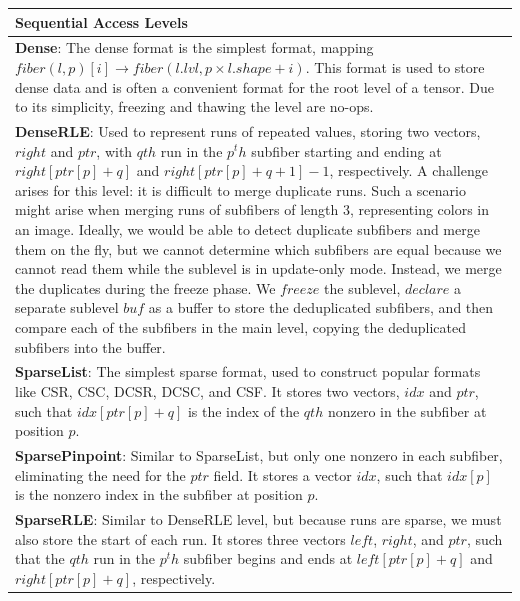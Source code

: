 \begin{table}[ht]
    \centering
    \scriptsize
    \renewcommand{\arraystretch}{1.3}
    \begin{tabular}{p{14cm}}

    \hline
    \textbf{Sequential Access Levels} \\
    \hline
    \textbf{Dense}:
    The dense format is the simplest format, mapping $fiber(l, p)[i] \rightarrow fiber(l.lvl, p \times l.shape + i)$.
    This format is used to store dense data and is often a convenient format for the root level of a tensor.
    Due to its simplicity, freezing and thawing the level are no-ops. \\
    \textbf{DenseRLE}:
    Used to represent runs of repeated values, storing two vectors, $right$ and $ptr$, with $qth$ run in the $p^th$ subfiber starting and ending at $right[ptr[p] + q]$ and $right[ptr[p] + q + 1] - 1$, respectively.
    A challenge arises for this level: it is difficult to merge duplicate runs.
    Such a scenario might arise when merging runs of subfibers of length 3, representing colors in an image.
    Ideally, we would be able to detect duplicate subfibers and merge them on the fly, but we cannot determine which subfibers are equal because we cannot read them while the sublevel is in update-only mode.
    Instead, we merge the duplicates during the freeze phase.
    We $freeze$ the sublevel, $declare$ a separate sublevel $buf$ as a buffer to store the deduplicated subfibers, and then compare each of the subfibers in the main level, copying the deduplicated subfibers into the buffer. \\
    \textbf{SparseList}:
    The simplest sparse format, used to construct popular formats like CSR, CSC, DCSR, DCSC, and CSF.
    It stores two vectors, $idx$ and $ptr$, such that $idx[ptr[p] + q]$ is the index of the $qth$ nonzero in the subfiber at position $p$. \\
    \textbf{SparsePinpoint}:
    Similar to SparseList, but only one nonzero in each subfiber, eliminating the need for the $ptr$ field.
    It stores a vector $idx$, such that $idx[p]$ is the nonzero index in the subfiber at position $p$. \\
    \textbf{SparseRLE}:
    Similar to DenseRLE level, but because runs are sparse, we must also store the start of each run.
    It stores three vectors $left$, $right$, and $ptr$, such that the $qth$ run in the $p^th$ subfiber begins and ends at $left[ptr[p] + q]$ and $right[ptr[p] + q]$, respectively.

\end{tabular}
\end{table}
